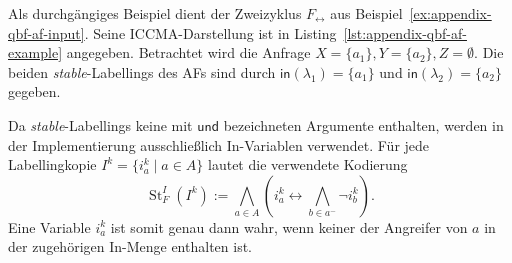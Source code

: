 \begin{Example}
\label{ex:appendix-qbf-stable-encoding}
Als durchgängiges Beispiel dient der Zweizyklus
\(F_{\leftrightarrow}\) aus
Beispiel~\ref{ex:appendix-qbf-af-input}. Seine ICCMA-Darstellung ist in
Listing~\ref{lst:appendix-qbf-af-example} angegeben. Betrachtet wird die Anfrage
\(
    X=\{a_1\},
    Y=\{a_2\},
    Z=\emptyset.
\)
Die beiden \emph{stable}-Labellings des AFs sind durch
\(
    \mathsf{in}(\lambda_1)=\{a_1\}
    \text{ und }
    \mathsf{in}(\lambda_2)=\{a_2\}
\)
gegeben.

Da \emph{stable}-Labellings keine mit \(\mathsf{und}\) bezeichneten
Argumente enthalten, werden in der Implementierung ausschließlich
In-Variablen verwendet. Für jede Labellingkopie
\(I^k=\{i_a^k\mid a\in A\}\) lautet die verwendete Kodierung
\[
    \operatorname{St}^{I}_F(I^k)
    :=
    \bigwedge_{a\in A}
    \left(
        i_a^k
        \leftrightarrow
        \bigwedge_{b\in a^-}\neg i_b^k
    \right).
\]
Eine Variable \(i_a^k\) ist somit genau dann wahr, wenn keiner der
Angreifer von \(a\) in der zugehörigen In-Menge enthalten ist.


\end{Example}
